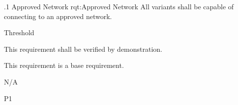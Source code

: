 \ONERQMTVKPP
{\RqtNumberBase.1}
{Approved Network}
{rqt:Approved Network}
{All \ThisSys variants shall be capable of connecting to an approved network.}
{
	\item [Phase 1] Threshold
}
{This requirement shall be verified by demonstration.}
{
	\item [N/A] This requirement is a base requirement.
}
{
  \item N/A
}
{P1}


